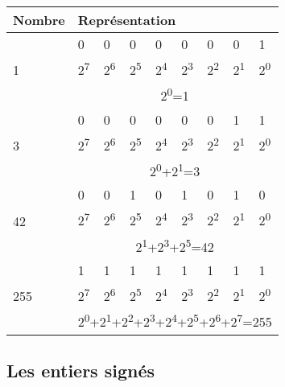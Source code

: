 \begin{table}
\centering
\begin{tabular}{|l|l|l|l|l|l|l|l|l|}\hline
  \rowcolor{gris-tab-entete}\bf Nombre&\multicolumn{8}{l|}{\bf Représentation}\\
  \hline
  \multirow{3}{2cm}{1} & 0 & 0 & 0 & 0 & 0 & 0 & 0 & 1 \\ 
  \cline{2-9}
  &2\textsuperscript{7}&2\textsuperscript{6}&2\textsuperscript{5}&2\textsuperscript{4}&2\textsuperscript{3}&2\textsuperscript{2}&2\textsuperscript{1}&2\textsuperscript{0}\\ 
  \cline{2-9}
   &\multicolumn{8}{c|}{2\textsuperscript{0}=1}\\ 
  \hline
  \multirow{3}{2cm}{3} & 0 & 0 & 0 & 0 & 0 & 0 & 1 & 1 \\
  \cline{2-9}
  &2\textsuperscript{7}&2\textsuperscript{6}&2\textsuperscript{5}&2\textsuperscript{4}&2\textsuperscript{3}&2\textsuperscript{2}&2\textsuperscript{1}&2\textsuperscript{0}\\
  \cline{2-9}
  &\multicolumn{8}{c|}{2\textsuperscript{0}+2\textsuperscript{1}=3}\\
  \hline
  \multirow{3}{2cm}{42} & 0 & 0 & 1 & 0 & 1 & 0 & 1 & 0 \\
  \cline{2-9}
  &2\textsuperscript{7}&2\textsuperscript{6}&2\textsuperscript{5}&2\textsuperscript{4}&2\textsuperscript{3}&2\textsuperscript{2}&2\textsuperscript{1}&2\textsuperscript{0}\\
  \cline{2-9}
  &\multicolumn{8}{c|}{2\textsuperscript{1}+2\textsuperscript{3}+2\textsuperscript{5}=42}\\
  \hline
  \multirow{3}{2cm}{255} & 1 & 1 & 1 & 1 & 1 & 1 & 1 & 1 \\
  \cline{2-9}
  &2\textsuperscript{7}&2\textsuperscript{6}&2\textsuperscript{5}&2\textsuperscript{4}&2\textsuperscript{3}&2\textsuperscript{2}&2\textsuperscript{1}&2\textsuperscript{0}\\
  \cline{2-9}
  &\multicolumn{8}{c|}{2\textsuperscript{0}+2\textsuperscript{1}+2\textsuperscript{2}+2\textsuperscript{3}+2\textsuperscript{4}+2\textsuperscript{5}+2\textsuperscript{6}+2\textsuperscript{7}=255}\\
  \hline
\end{tabular}
\end{table}

\subsection{Les entiers signés}
\label{les-entiers-signes}

